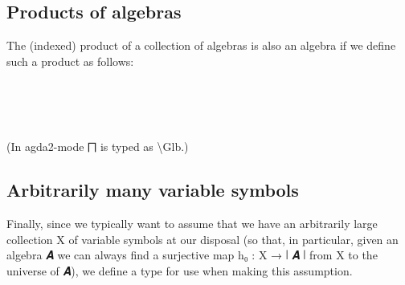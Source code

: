 \documentclass[a4paper,UKenglish,cleveref, autoref, thm-restate]{lipics-v2019}
\begin{document}
\subsection{Products of algebras}
The (indexed) product of a collection of algebras is also an algebra if we define such a product as follows:
\begin{code}%
%
\>[1]\AgdaSpace{}%
\AgdaSymbol{:}\AgdaSpace{}%
\AgdaSymbol{\{}\AgdaSpace{}%
\AgdaSymbol{:}\AgdaSpace{}%
\AgdaSpace{}%
\AgdaSpace{}%
\AgdaSymbol{\}(}\AgdaSpace{}%
\AgdaSymbol{:}\AgdaSpace{}%
\AgdaSpace{}%
\AgdaSpace{}%
\AgdaSpace{}%
\AgdaSpace{}%
\AgdaSpace{}%
\AgdaSymbol{)}\AgdaSpace{}%
\AgdaSpace{}%
\AgdaSpace{}%
\AgdaSymbol{(}\AgdaSpace{}%
\AgdaSpace{}%
\AgdaSymbol{)}\AgdaSpace{}%
\<%
\\
%
\>[1]\AgdaSpace{}%
\AgdaSpace{}%
\AgdaSymbol{=}%
\>[8]\AgdaSymbol{((}\AgdaSpace{}%
\AgdaSymbol{:}\AgdaSpace{}%
\AgdaSymbol{\AgdaUnderscore{})}\AgdaSpace{}%
\AgdaSpace{}%
\AgdaSpace{}%
\AgdaSpace{}%
\AgdaSpace{}%
\AgdaSymbol{)}\AgdaSpace{}%
\AgdaOperator{\AgdaInductiveConstructor{,}}%
\>[31]\AgdaSpace{}%
\AgdaSpace{}%
\AgdaSpace{}%
\AgdaSpace{}%
\AgdaSpace{}%
\AgdaSymbol{(}\AgdaSpace{}%
\AgdaSpace{}%
\AgdaSpace{}%
\AgdaSymbol{)}\AgdaSpace{}%
\AgdaSpace{}%
\AgdaSpace{}%
\AgdaSpace{}%
\AgdaSpace{}%
\AgdaSpace{}%
\<%
\\
%
\\[\AgdaEmptyExtraSkip]%
%
\>[1]\AgdaSpace{}%
\AgdaSpace{}%
\<%
\end{code}
(In agda2-mode ⨅ is typed as \textbackslash Glb.)

\subsection{Arbitrarily many variable symbols}

Finally, since we typically want to assume that we have an arbitrarily large collection X of variable symbols at our disposal (so that, in particular, given an algebra 𝑨 we can always find a surjective map h₀ : X → ∣ 𝑨 ∣ from X to the universe of 𝑨), we define a type for use when making this assumption.
\end{document}
